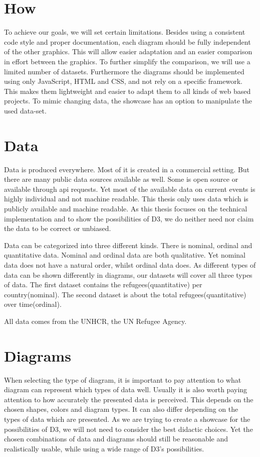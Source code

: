 \documentclass[
a4paper,     %
12pt         %
]{scrartcl}  %
\begin{document}
\section{How}
To achieve our goals, we will set certain limitations. Besides using a consistent code style and proper documentation, each diagram should be fully independent of the other graphics. This will allow easier adaptation and an easier comparison in effort between the graphics. To further simplify the comparison, we will use a limited number of datasets. Furthermore the diagrams should be implemented using only JavaScript, HTML and CSS, and not rely on a specific framework. This makes them lightweight and easier to adapt them to all kinds of web based projects. To mimic changing data, the showcase has an option to manipulate the used data-set.

\section{Data}
Data is produced everywhere. Most of it is created in a commercial setting. But there are many public data sources available as well. Some is open source or available through api requests. Yet most of the available data on current events is highly individual and not machine readable. This thesis only uses data which is publicly available and machine readable. As this thesis focuses on the technical implementation and to show the possibilities of D3, we do neither need nor claim the data to be correct or unbiased.

Data can be categorized into three different kinds. There is nominal, ordinal and quantitative data. Nominal and ordinal data are both qualitative. Yet nominal data does not have a natural order, whilst ordinal data does. As different types of data can be shown differently in diagrams, our datasets will cover all three types of data. The first dataset contains the refugees(quantitative) per country(nominal). The second dataset is about the total refugees(quantitative) over time(ordinal).

All data comes from the UNHCR, the UN Refugee Agency\cite{unhcr}.

\section{Diagrams}
When selecting the type of diagram, it is important to pay attention to what diagram can represent which types of data well. Usually it is also worth paying attention to how accurately the presented data is perceived. This depends on the chosen shapes, colors and diagram types.\cite{heer2010crowdsourcing} It can also differ depending on the types of data which are presented\cite{mackinlay1986automating}. As we are trying to create a showcase for the possibilities of D3, we will not need to consider the best didactic choices. Yet the chosen combinations of data and diagrams should still be reasonable and realistically usable, while using a wide range of D3's possibilities.
\end{document}
